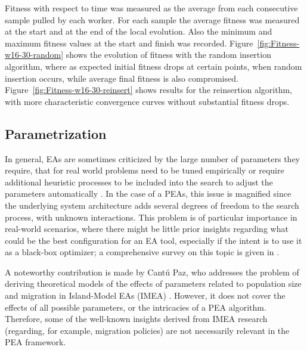 Fitness with respect to time was measured as the average from each consecutive
sample pulled by each worker. For each sample the average fitness
was measured at the start and at the end of the local evolution.
Also the minimum and maximum fitness values at the start and finish was 
recorded.    
Figure~\ref{fig:Fitness-w16-30-random} shows the evolution of fitness
with the random insertion algorithm, where as expected initial fitness drops
at certain points, when random insertion occurs, while average final fitness 
is also compromised. Figure~\ref{fig:Fitness-w16-30-reinsert}
shows results for the reinsertion algorithm, with more
characteristic convergence curves without substantial fitness drops. 





\subsection{Parametrization}
In general, EAs are sometimes criticized by the large number of parameters they require,
that for real world problems need to be tuned empirically or require additional heuristic processes to be included into the search to
adjust the parameters automatically \cite{parameters,ss}.
In the case of a PEAs, this issue is magnified since the underlying system architecture adds several degrees of freedom to the search process,
with unknown interactions.
This problem is of particular importance in real-world scenarios, where there might be little prior insights regarding what could be the best
configuration for an EA tool, especially if the intent is to use it as a black-box optimizer;
a comprehensive survey on this topic is given in \cite{parameters}. 

A noteworthy contribution is made by Cant\'u Paz, who addresses the problem of deriving theoretical models of the effects
of parameters related to population size and migration in Island-Model EAs (IMEA) \cite{cantu}.
However, it does not cover the effects of all possible parameters, or the intricacies of a PEA algorithm.
Therefore, some of the well-known insights derived from IMEA research (regarding, for example, migration policies) are not necessarily relevant in the PEA framework.

